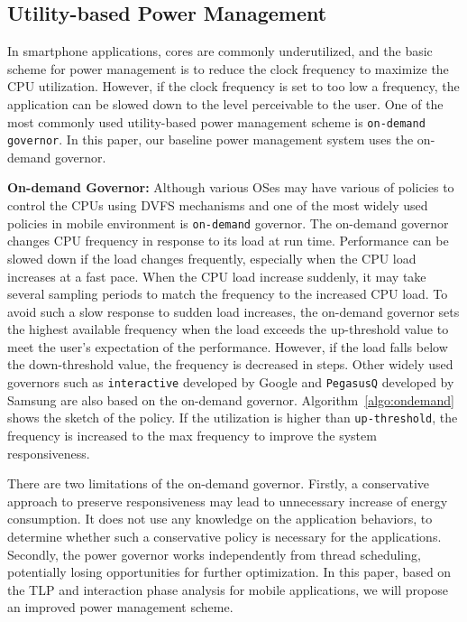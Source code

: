 \subsection{Utility-based Power Management}

In smartphone applications, cores are commonly underutilized, and the basic scheme for 
power management is to reduce the clock frequency to maximize the CPU utilization.
However, if the clock frequency is set to too low a frequency, the application can be slowed down
to the level perceivable to the user. One of the most commonly used utility-based
power management scheme is {\tt on-demand governor}. In this paper, our baseline
power management system uses the on-demand governor.

{\bf On-demand Governor: } 
Although various OSes may have various of policies to control the CPUs using DVFS mechanisms 
and one of the most widely used policies in mobile environment is {\tt on-demand} governor. 
The on-demand governor changes CPU frequency in response to its load at run time.
Performance can be slowed down if the load changes frequently, especially when the CPU load increases at a fast pace. 
When the CPU load increase suddenly, it may take several sampling periods
to match the frequency to the increased CPU load.
To avoid such a slow response to sudden load increases, the on-demand governor sets the highest available frequency 
when the load exceeds the up-threshold value to meet the user's expectation of the performance.
However, if the load falls below the down-threshold value, the frequency is decreased in steps.
Other widely used governors such as {\tt interactive} developed by Google and {\tt PegasusQ} developed by Samsung
are also based on the on-demand governor.
Algorithm~\ref{algo:ondemand} shows the sketch of the policy. If the utilization is higher than {\tt up-threshold},
the frequency is increased to the max frequency to improve the system responsiveness.

There are two limitations of the on-demand governor. Firstly, a conservative approach to preserve responsiveness 
may lead to unnecessary increase of energy consumption. It does not use any knowledge on the application
behaviors, to determine whether such a conservative policy is necessary for the applications.
Secondly,
the power governor works independently from thread scheduling, potentially losing opportunities for
further optimization. In this paper, based on the TLP and interaction phase analysis for mobile applications,
we will propose an improved power management scheme. 


